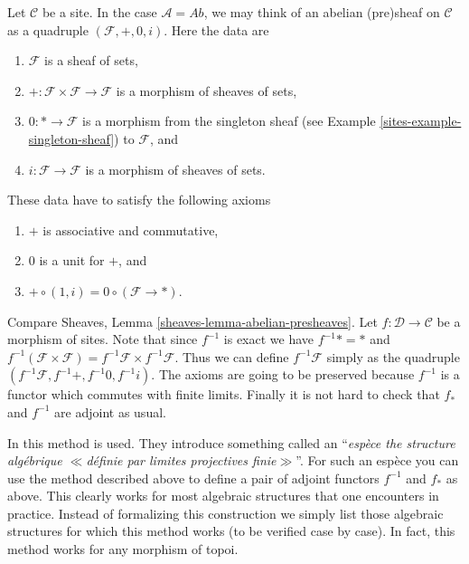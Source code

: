 \medskip\noindent
Let $\mathcal{C}$ be a site.
In the case $\mathcal{A} = \textit{Ab}$,
we may think of an abelian (pre)sheaf on $\mathcal{C}$
as a quadruple $(\mathcal{F}, +, 0, i)$.
Here the data are
\begin{enumerate}
\item[(D1)] $\mathcal{F}$ is a sheaf of sets,
\item[(D2)] $+ : \mathcal{F} \times \mathcal{F} \to \mathcal{F}$ is
a morphism of sheaves of sets,
\item[(D3)] $0 : * \to \mathcal{F}$ is a morphism from the
singleton sheaf (see Example \ref{sites-example-singleton-sheaf})
to $\mathcal{F}$, and
\item[(D4)] $i : \mathcal{F} \to \mathcal{F}$ is a morphism of sheaves
of sets.
\end{enumerate}
These data have to satisfy the following axioms
\begin{enumerate}
\item[(A1)] $+$ is associative and commutative,
\item[(A2)] $0$ is a unit for $+$, and
\item[(A3)] $+ \circ (1, i) = 0 \circ (\mathcal{F} \to *)$.
\end{enumerate}
Compare Sheaves, Lemma \ref{sheaves-lemma-abelian-presheaves}.
Let $f : \mathcal{D} \to \mathcal{C}$ be a morphism of sites.
Note that since $f^{-1}$ is exact we have
$f^{-1}* = *$ and
$f^{-1}(\mathcal{F} \times \mathcal{F}) =
f^{-1}\mathcal{F} \times f^{-1}\mathcal{F}$.
Thus we can define $f^{-1}\mathcal{F}$ simply as the quadruple
$(f^{-1}\mathcal{F}, f^{-1}+, f^{-1}0, f^{-1}i)$. The axioms
are going to be preserved because $f^{-1}$ is a functor
which commutes with finite limits. Finally it is not hard
to check that $f_*$ and $f^{-1}$ are adjoint as usual.

\medskip\noindent
In \cite{SGA4} this method is used. They introduce something
called an ``{\it esp\`ece the structure alg\'ebrique $\ll$d\'efinie
par limites projectives finie$\gg$}''. For such an esp\`ece you
can use the method described above to define a pair of adjoint
functors $f^{-1}$ and $f_*$ as above. This clearly works for most
algebraic structures that one encounters in practice.
Instead of formalizing this construction we simply list those
algebraic structures for which this method works (to be
verified case by case). In fact, this method works for any
morphism of topoi.

